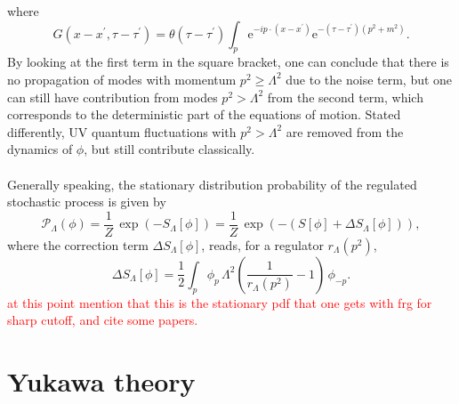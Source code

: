 where
\begin{equation*}
    G\left(x-x^{\prime}, \tau-\tau^{\prime}\right) =\theta\left(\tau-\tau^{\prime}\right) \int_p \mathrm{e}^{-i p \cdot\left(x-x^{\prime}\right)} \mathrm{e}^{-\left(\tau-\tau^{\prime}\right)\left(p^2+m^2\right)}.
\end{equation*}
By looking at the first term in the square bracket, one can conclude that there is no propagation of modes with momentum $p^2\geq \Lambda^2$ due to the noise term, but one can still have contribution from modes $p^2 > \Lambda^2$ from the second term, which corresponds to the deterministic part of the equations of motion. Stated differently, UV quantum fluctuations with $p^2 > \Lambda^2$ are removed from the dynamics of $\phi$, but still contribute classically. \\~\\
Generally speaking, the stationary distribution probability of the regulated stochastic process is given by \cite{Pawlowski2017CoolingNoise}
\begin{equation}
    \mathcal{P}_\Lambda(\phi) = \frac{1}{Z} \, \exp\left(-S_\Lambda[\phi]\right) = \frac{1}{Z} \, \exp\left(-(S[\phi] + \Delta S_\Lambda[\phi])\right),
    \label{eq:probability_field_configuration_regularised}
\end{equation}
where the correction term $\Delta S_\Lambda[\phi]$, reads, for a regulator $r_\Lambda(p^2)$,
\begin{equation*}
        \Delta S_{\Lambda}[\phi]=\frac{1}{2} \int_p \phi_p \, \Lambda^2\left(\frac{1}{r_{\Lambda}\left(p^2\right)}-1\right) \, \phi_{-p}.
\end{equation*}
\textcolor{red}{at this point mention that this is the stationary pdf that one gets with frg for sharp cutoff, and cite some papers.}


\section{Yukawa theory}
\label{sec:Yukawa_theory}


